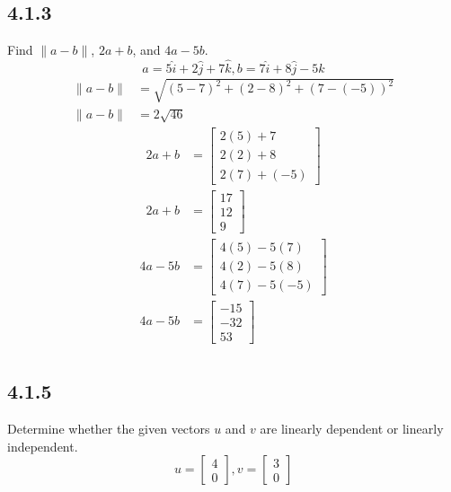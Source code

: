 \documentclass{article}
\begin{document}
\subsection{4.1.3}
Find $ \|a - b\| $, $ 2a + b $, and $ 4a - 5b $.
$$ a = 5\hat{i} + 2\hat{j} + 7\hat{k}, b = 7\hat{i} + 8\hat{j} - 5\hat{k} $$
\begin{align*}
	\|a - b\| & = \sqrt{ (5 - 7)^2 + (2 - 8)^2 + (7- (-5))^2 } \\
	\|a - b\| & = 2\sqrt{46}
\end{align*}
\begin{align*}
	2a + b & =
		\begin{bmatrix}
			2(5) + 7 \\
			2(2) + 8 \\
			2(7) + (-5)
		\end{bmatrix} \\
	2a + b & =
		\begin{bmatrix}
			17 \\
			12 \\
			9
		\end{bmatrix}
\end{align*}
\begin{align*}
	4a - 5b & =
		\begin{bmatrix}
			4(5) - 5(7) \\
			4(2) - 5(8) \\
			4(7) - 5(-5)
		\end{bmatrix} \\
	4a - 5b & =
		\begin{bmatrix}
			-15 \\
			-32 \\
			53
		\end{bmatrix} \\
\end{align*}

\subsection{4.1.5}
Determine whether the given vectors $ u $ and $ v $ are linearly dependent or linearly independent.
$$
	u =
		\begin{bmatrix}
			4 \\
			0
		\end{bmatrix},
	v =
		\begin{bmatrix}
			3 \\
			0
		\end{bmatrix}
$$
\end{document}
